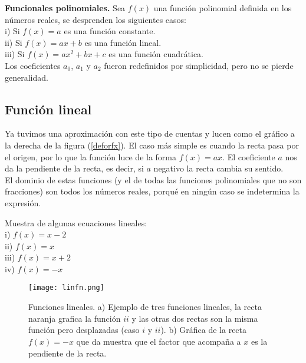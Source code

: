 \begin{mydef}
\textbf{Funcionales polinomiales.} Sea $f(x)$ una función polinomial definida en los números reales, se desprenden los siguientes casos:\\

\noindent i) Si $f(x)=a$ es una función constante.\\
\noindent ii) Si $f(x)=ax+b$ es una función lineal.\\
\noindent iii) Si $f(x)=ax^{2}+bx+c$ es una función cuadrática.\\

Los coeficientes $a_{0}$, $a_{1}$ y $a_{2}$ fueron redefinidos por simplicidad, pero no se pierde generalidad.\\
\end{mydef}

\subsection{Función lineal}
Ya tuvimos una aproximación con este tipo de cuentas y lucen como el gráfico a la derecha de la figura (\ref{deforfx}). El caso más simple es cuando la recta pasa por el origen, por lo que la función luce de la forma $f(x)=ax$. El coeficiente $a$ nos da la pendiente de la recta, es decir, si $a$ negativo la recta cambia su sentido.\\

El dominio de estas funciones (y el de todas las funciones polinomiales que no son fracciones) son todos los números reales, porqué en ningún caso se indetermina la expresión.
\begin{myexample}
Muestra de algunas ecuaciones lineales:\\

\noindent i) $f(x)= x-2$ \\
\noindent ii) $f(x)=x $\\
\noindent iii) $f(x)= x+2 $\\
\noindent iv) $f(x)= -x$ \\

\begin{center}
\begin{figure}[h!]
\centering
\texttt{[image: linfn.png]}
\caption[Funciones lineales.]{Funciones lineales. a) Ejemplo de tres funciones lineales, la recta naranja grafica la función $ii$ y las otras dos rectas son la misma función pero desplazadas (caso $i$ y $ii$). b) Gráfica de la recta $f(x)=-x$ que da muestra que el factor que acompaña a $x$ es la pendiente de la recta.} \label{linfn}
\end{figure}
\end{center}
\end{myexample}



